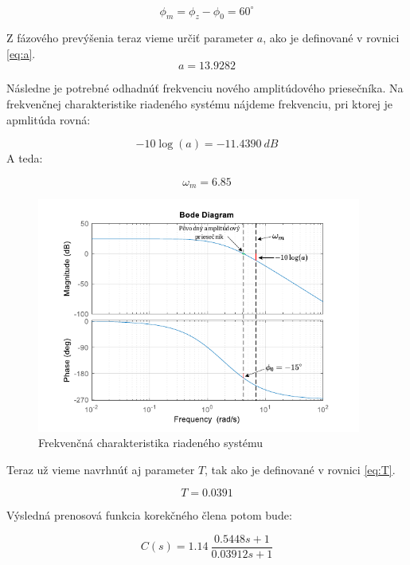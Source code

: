 \documentclass[a4paper,10pt]{article}
\begin{document}
\begin{equation}
\phi_m=\phi_z-\phi_0=60^\circ
\end{equation}

Z fázového prevýšenia teraz vieme určiť parameter $a$, ako je definované v rovnici \eqref{eq:a}.
\begin{equation}
 a=13.9282
\end{equation} 

Následne je potrebné odhadnúť frekvenciu nového amplitúdového priesečníka.
Na frekvenčnej charakteristike riadeného systému nájdeme frekvenciu, pri ktorej je apmlitúda rovná:
 
\begin{equation}
 -10\log(a)=-11.4390\: dB
\end{equation}
A teda:

\begin{equation}
 \omega_m=6.85
\end{equation}

\begin{figure}[ht]
\centering
\includegraphics[width=0.95\textwidth]{SystemBode}
\caption{Frekvenčná charakteristika riadeného systému}
\end{figure}

\pagebreak

Teraz už vieme navrhnúť aj parameter $T$, tak ako je definované v rovnici \eqref{eq:T}.

\begin{equation}
 T=0.0391
\end{equation}  

Výsledná prenosová funkcia korekčného člena potom bude:

\begin{equation}
 C(s)=1.14\:\frac{0.5448s+1}{0.03912s+1}
\end{equation}
\end{document}
